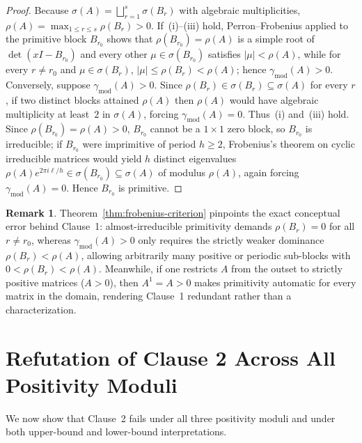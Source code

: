 \documentclass[11pt]{article}
\theoremstyle{definition}
\newtheorem{remark}[theorem]{Remark}
\begin{document}
\begin{proof}
Because $\sigma(A) = \bigsqcup_{r=1}^s \sigma(B_r)$ with algebraic multiplicities, $\rho(A) = \max_{1 \le r \le s} \rho(B_r) > 0$. If~(i)--(iii) hold, Perron--Frobenius applied to the primitive block $B_{r_0}$ shows that $\rho(B_{r_0}) = \rho(A)$ is a simple root of $\det(x I - B_{r_0})$ and every other $\mu \in \sigma(B_{r_0})$ satisfies $|\mu| < \rho(A)$, while for every $r \neq r_0$ and $\mu \in \sigma(B_r)$, $|\mu| \le \rho(B_r) < \rho(A)$; hence $\gamma_{\mathrm{mod}}(A) > 0$. Conversely, suppose $\gamma_{\mathrm{mod}}(A) > 0$. Since $\rho(B_r) \in \sigma(B_r) \subseteq \sigma(A)$ for every $r$, if two distinct blocks attained $\rho(A)$ then $\rho(A)$ would have algebraic multiplicity at least~$2$ in $\sigma(A)$, forcing $\gamma_{\mathrm{mod}}(A) = 0$. Thus~(i) and~(iii) hold. Since $\rho(B_{r_0}) = \rho(A) > 0$, $B_{r_0}$ cannot be a $1 \times 1$ zero block, so $B_{r_0}$ is irreducible; if $B_{r_0}$ were imprimitive of period $h \ge 2$, Frobenius's theorem on cyclic irreducible matrices would yield $h$ distinct eigenvalues $\rho(A) e^{2\pi i \ell / h} \in \sigma(B_{r_0}) \subseteq \sigma(A)$ of modulus $\rho(A)$, again forcing $\gamma_{\mathrm{mod}}(A) = 0$. Hence $B_{r_0}$ is primitive.
\end{proof}

\begin{remark}
Theorem~\ref{thm:frobenius-criterion} pinpoints the exact conceptual error behind Clause~1: almost-irreducible primitivity demands $\rho(B_r) = 0$ for all $r \neq r_0$, whereas $\gamma_{\mathrm{mod}}(A) > 0$ only requires the strictly weaker dominance $\rho(B_r) < \rho(A)$, allowing arbitrarily many positive or periodic sub-blocks with $0 < \rho(B_r) < \rho(A)$. Meanwhile, if one restricts $A$ from the outset to strictly positive matrices ($A > 0$), then $A^1 = A > 0$ makes primitivity automatic for every matrix in the domain, rendering Clause~1 redundant rather than a characterization.
\end{remark}

\section{Refutation of Clause 2 Across All Positivity Moduli}

We now show that Clause~2 fails under all three positivity moduli and under both upper-bound and lower-bound interpretations.
\end{document}
